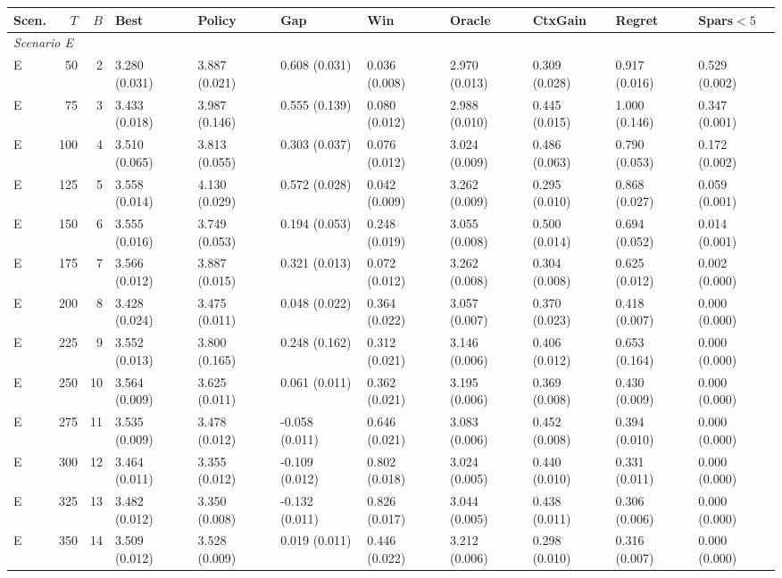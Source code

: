 \begin{tabular}{lrrllllllll}
\toprule
Scen. & $T$ & $B$ & Best & Policy & Gap & Win & Oracle & CtxGain & Regret & Spars$<5$ \\
\midrule
\multicolumn{11}{l}{\textit{Scenario E}} \\
\midrule
E & 50 & 2 & 3.280 (0.031) & 3.887 (0.021) & 0.608 (0.031) & 0.036 (0.008) & 2.970 (0.013) & 0.309 (0.028) & 0.917 (0.016) & 0.529 (0.002) \\
E & 75 & 3 & 3.433 (0.018) & 3.987 (0.146) & 0.555 (0.139) & 0.080 (0.012) & 2.988 (0.010) & 0.445 (0.015) & 1.000 (0.146) & 0.347 (0.001) \\
E & 100 & 4 & 3.510 (0.065) & 3.813 (0.055) & 0.303 (0.037) & 0.076 (0.012) & 3.024 (0.009) & 0.486 (0.063) & 0.790 (0.053) & 0.172 (0.002) \\
E & 125 & 5 & 3.558 (0.014) & 4.130 (0.029) & 0.572 (0.028) & 0.042 (0.009) & 3.262 (0.009) & 0.295 (0.010) & 0.868 (0.027) & 0.059 (0.001) \\
E & 150 & 6 & 3.555 (0.016) & 3.749 (0.053) & 0.194 (0.053) & 0.248 (0.019) & 3.055 (0.008) & 0.500 (0.014) & 0.694 (0.052) & 0.014 (0.001) \\
E & 175 & 7 & 3.566 (0.012) & 3.887 (0.015) & 0.321 (0.013) & 0.072 (0.012) & 3.262 (0.008) & 0.304 (0.008) & 0.625 (0.012) & 0.002 (0.000) \\
E & 200 & 8 & 3.428 (0.024) & 3.475 (0.011) & 0.048 (0.022) & 0.364 (0.022) & 3.057 (0.007) & 0.370 (0.023) & 0.418 (0.007) & 0.000 (0.000) \\
E & 225 & 9 & 3.552 (0.013) & 3.800 (0.165) & 0.248 (0.162) & 0.312 (0.021) & 3.146 (0.006) & 0.406 (0.012) & 0.653 (0.164) & 0.000 (0.000) \\
E & 250 & 10 & 3.564 (0.009) & 3.625 (0.011) & 0.061 (0.011) & 0.362 (0.021) & 3.195 (0.006) & 0.369 (0.008) & 0.430 (0.009) & 0.000 (0.000) \\
E & 275 & 11 & 3.535 (0.009) & 3.478 (0.012) & -0.058 (0.011) & 0.646 (0.021) & 3.083 (0.006) & 0.452 (0.008) & 0.394 (0.010) & 0.000 (0.000) \\
E & 300 & 12 & 3.464 (0.011) & 3.355 (0.012) & -0.109 (0.012) & 0.802 (0.018) & 3.024 (0.005) & 0.440 (0.010) & 0.331 (0.011) & 0.000 (0.000) \\
E & 325 & 13 & 3.482 (0.012) & 3.350 (0.008) & -0.132 (0.011) & 0.826 (0.017) & 3.044 (0.005) & 0.438 (0.011) & 0.306 (0.006) & 0.000 (0.000) \\
E & 350 & 14 & 3.509 (0.012) & 3.528 (0.009) & 0.019 (0.011) & 0.446 (0.022) & 3.212 (0.006) & 0.298 (0.010) & 0.316 (0.007) & 0.000 (0.000) \\

\end{tabular}
